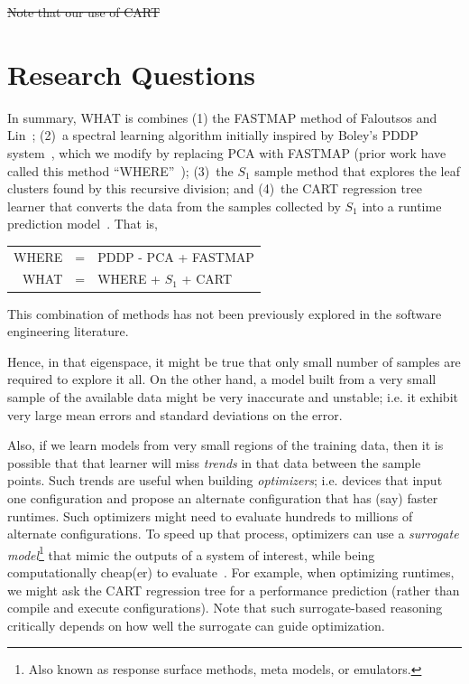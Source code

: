 \documentclass{sig-alternative}
\begin{document}
\st{Note that our use of CART }
\section{Research Questions} 
In summary, WHAT is combines
(1) the FASTMAP method of Faloutsos and Lin~\cite{Faloutsos1995};
(2)~a spectral learning algorithm initially   inspired by    Boley's PDDP system~\cite{boley98}, which we modify
by replacing  PCA with FASTMAP (prior work have called this
method ``WHERE''~\cite{me12d});
(3)~the $S_1$ sample method that explores the leaf clusters found by this recursive division;
and (4)~the CART regression tree learner that converts the data from the samples collected by $S_1$
into a runtime prediction model~\cite{breiman1984}.
That is,
\begin{center}
\begin{tabular}{rcl}
WHERE& = &PDDP - PCA + FASTMAP\\ 
WHAT& =  & WHERE + $S_1$ + CART
\end{tabular}
\end{center}
This combination of methods has not been previously explored in the
software engineering literature.


Hence, in that eigenspace, it might be true that only small
number of samples are required to explore it all.
On the other hand, a model built from a very small sample of the available data might
be very inaccurate and unstable; i.e. it exhibit very large mean errors and standard deviations on the error.

Also, if we learn models from very small regions of the training data,
then it is  possible that that learner will miss {\em trends} in that data
between the sample points. Such trends are useful when building {\em optimizers};
i.e. devices that input one configuration and propose an alternate
configuration that has (say) faster runtimes. Such optimizers might
need to evaluate hundreds to millions of alternate configurations. 
To speed up that process, optimizers can use a {\em surrogate model}\footnote{Also known as response surface methods, meta models, or emulators.}
that  mimic the outputs of a system of interest, while being computationally cheap(er) to evaluate~\cite{loshchilov13}. For example, when optimizing
runtimes, we might ask the CART regression tree for a performance
prediction (rather than compile and execute
configurations).  Note that such surrogate-based
reasoning critically depends on how well the surrogate can guide optimization.
\end{document}
